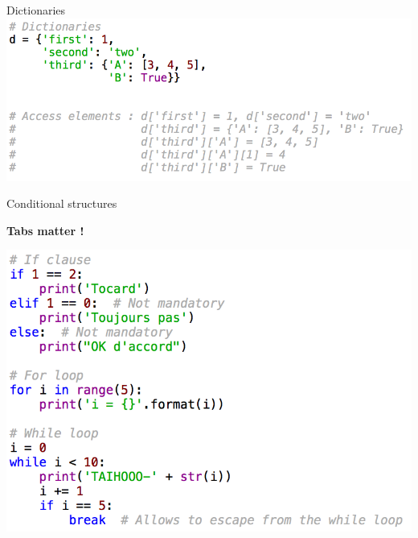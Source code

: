 \documentclass[11pt,unknownkeysallowed,usenames,dvipsnames]{beamer}
\begin{document}
\begin{frame}{Dictionaries}
    \includegraphics[width=0.9\linewidth]{code-dictionaries}
\end{frame}


%        
%        
%    
\begin{frame}{Conditional structures}
    \vspace{-5pt}
    \begin{center}
        \textbf{Tabs matter !}
    \end{center}
    \vspace{-5pt}
    \includegraphics[width=0.8\linewidth]{code-conditional-structures}

\end{frame}
\end{document}
